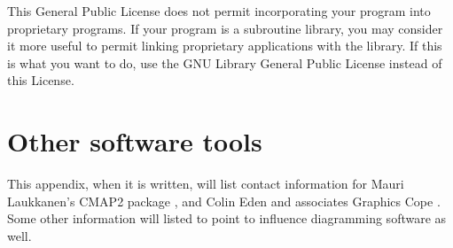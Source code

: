 \documentclass[%
	11pt,
        a4paper,
        twoside]{workrep}
\begin{document}
This General Public License does not permit incorporating your program into
proprietary programs.  If your program is a subroutine library, you may
consider it more useful to permit linking proprietary applications with the
library.  If this is what you want to do, use the GNU Library General
Public License instead of this License.

\chapter{Other software tools}\label{app:other}

This appendix, when it is written, will list contact information
for Mauri Laukkanen's CMAP2 package
\cite{Laukkanen90:ScandJM,Laukkanen92:Book},
and Colin Eden and associates Graphics Cope
\cite{AckermannETAL92:COPE,EdenAckermannCropper92:JMS}.
Some other information will listed to point
to influence diagramming software as well.




\end{document}
